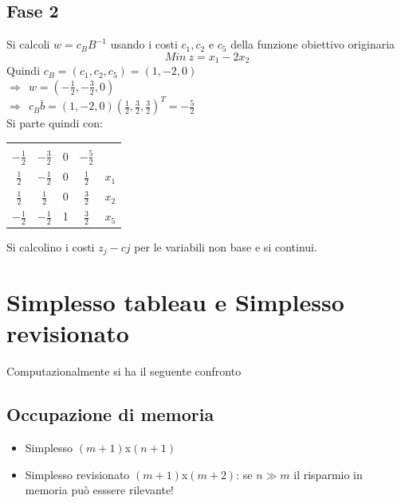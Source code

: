 \subsection{Fase 2}
Si calcoli $w=c_{B}B^{-1}$ usando i costi $c_{1},c_{2}$ e $c_{5}$ della funzione obiettivo originaria
\begin{equation*}
	Min\ z=x_{1}-2x_{2}
\end{equation*}
Quindi $c_{B}=(c_{1},c_{2},c_{5})=(1,-2,0)$\\
$\Rightarrow\ \ w=(-\frac{1}{2},-\frac{3}{2},0)$\\
$\Rightarrow\ \ c_{B}\bar{b}=(1,-2,0)(\frac{1}{2},\frac{3}{2},\frac{3}{2})^{T}=-\frac{5}{2}$\\
Si parte quindi con:
\begin{table}[!h]
	\centering
	\def\arraystretch{2}
	\begin{tabular}{|ccc|c|c}
		\multicolumn{1}{c}{} & & \multicolumn{1}{c}{} & \multicolumn{1}{c}{} & \\ \cline{1-4}
		$-\frac{1}{2}$ & $-\frac{3}{2}$ & 0 & $-\frac{5}{2}$ & \\ \cline{1-4}
		$\frac{1}{2}$  & $-\frac{1}{2}$ & 0 & $\frac{1}{2}$ & $x_{1}$ \\
		$\frac{1}{2}$  & $\frac{1}{2}$ & 0 & $\frac{3}{2}$ & $x_{2}$ \\
		$-\frac{1}{2}$ & $-\frac{1}{2}$ & 1 & $\frac{3}{2}$ & $x_{5}$ \\ \cline{1-4}
	\end{tabular}
\end{table}

Si calcolino i costi $z_{j}-c{j}$ per le variabili non base e si continui.

\clearpage
\section{Simplesso tableau e Simplesso revisionato}
Computazionalmente si ha il seguente confronto

\subsection{Occupazione di memoria}
\begin{itemize}
	\item Simplesso $(m+1)$x$(n+1)$
	\item Simplesso revisionato $(m+1)$x$(m+2)$: se $n\gg m$ il risparmio in memoria può esssere rilevante!
\end{itemize}

